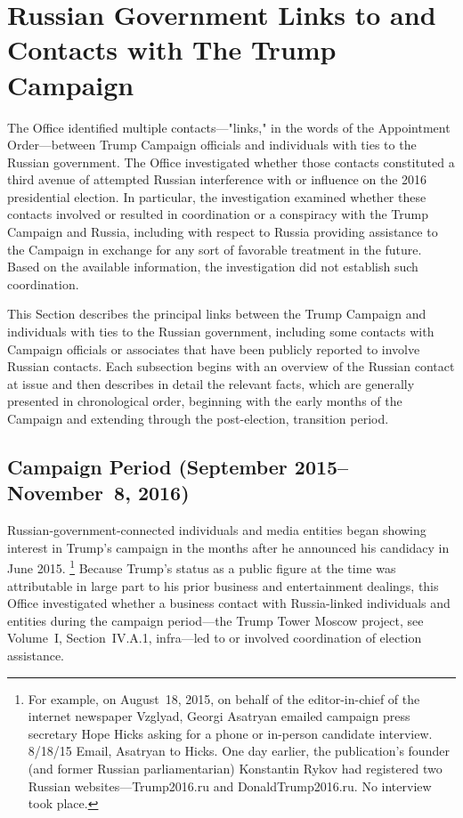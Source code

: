 \section{Russian Government Links to and Contacts with The Trump Campaign}

The Office identified multiple contacts---"links," in the words of the Appointment Order---between Trump Campaign officials and individuals with ties to the Russian government.
The Office investigated whether those contacts constituted a third avenue of attempted Russian interference with or influence on the 2016 presidential election.
In particular, the investigation examined whether these contacts involved or resulted in coordination or a conspiracy with the Trump Campaign and Russia, including with respect to Russia providing assistance to the Campaign in exchange for any sort of favorable treatment in the future.
Based on the available information, the investigation did not establish such coordination.

This Section describes the principal links between the Trump Campaign and individuals with ties to the Russian government, including some contacts with Campaign officials or associates that have been publicly reported to involve Russian contacts.
Each subsection begins with an overview of the Russian contact at issue and then describes in detail the relevant facts, which are generally presented in chronological order, beginning with the early months of the Campaign and extending through the post-election, transition period.

\subsection{Campaign Period (September 2015--November~8, 2016)}

Russian-government-connected individuals and media entities began showing interest in Trump's campaign in the months after he announced his candidacy in June 2015.%
\footnote{For example, on August~18, 2015, on behalf of the editor-in-chief of the internet newspaper Vzglyad, Georgi Asatryan emailed campaign press secretary Hope Hicks asking for a phone or in-person candidate interview.
8/18/15 Email, Asatryan to Hicks.
One day earlier, the publication's founder (and former Russian parliamentarian) Konstantin Rykov had registered two Russian websites---Trump2016.ru and DonaldTrump2016.ru.
No interview took place.}
Because Trump's status as a public figure at the time was attributable in large part to his prior business and entertainment dealings, this Office investigated whether a business contact with Russia-linked individuals and entities during the campaign period---the Trump Tower Moscow project, see Volume~I, Section~IV.A.1, infra---led to or involved coordination of election assistance.

